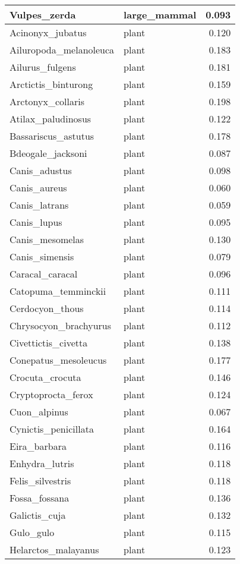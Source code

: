 \begin{table}
\begin{tabular}[t]{l|l|r}
\hline
Vulpes\_zerda & large\_mammal & 0.093\\
\hline
Acinonyx\_jubatus & plant & 0.120\\
\hline
Ailuropoda\_melanoleuca & plant & 0.183\\
\hline
Ailurus\_fulgens & plant & 0.181\\
\hline
Arctictis\_binturong & plant & 0.159\\
\hline
Arctonyx\_collaris & plant & 0.198\\
\hline
Atilax\_paludinosus & plant & 0.122\\
\hline
Bassariscus\_astutus & plant & 0.178\\
\hline
Bdeogale\_jacksoni & plant & 0.087\\
\hline
Canis\_adustus & plant & 0.098\\
\hline
Canis\_aureus & plant & 0.060\\
\hline
Canis\_latrans & plant & 0.059\\
\hline
Canis\_lupus & plant & 0.095\\
\hline
Canis\_mesomelas & plant & 0.130\\
\hline
Canis\_simensis & plant & 0.079\\
\hline
Caracal\_caracal & plant & 0.096\\
\hline
Catopuma\_temminckii & plant & 0.111\\
\hline
Cerdocyon\_thous & plant & 0.114\\
\hline
Chrysocyon\_brachyurus & plant & 0.112\\
\hline
Civettictis\_civetta & plant & 0.138\\
\hline
Conepatus\_mesoleucus & plant & 0.177\\
\hline
Crocuta\_crocuta & plant & 0.146\\
\hline
Cryptoprocta\_ferox & plant & 0.124\\
\hline
Cuon\_alpinus & plant & 0.067\\
\hline
Cynictis\_penicillata & plant & 0.164\\
\hline
Eira\_barbara & plant & 0.116\\
\hline
Enhydra\_lutris & plant & 0.118\\
\hline
Felis\_silvestris & plant & 0.118\\
\hline
Fossa\_fossana & plant & 0.136\\
\hline
Galictis\_cuja & plant & 0.132\\
\hline
Gulo\_gulo & plant & 0.115\\
\hline
Helarctos\_malayanus & plant & 0.123\\

\end{tabular}
\end{table}

